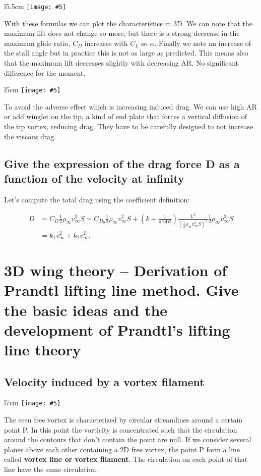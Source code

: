 \documentclass[british,french,11pt, a4paper, openany]{article}
\newcommand{\wrapfig}[6]{%
	\begin{wrapfigure}[#1]{#2}{#3cm}%
		\vspace{-5mm}%
		\texttt{[image: \#5]}%
		\captionof{figure}{}%
		\label{#6}%
	\end{wrapfigure}%
}
\begin{document}
\wrapfig{8}{l}{5.5}{0.08}{ch3/8}{fig:3.8}
With these formulas we can plot the characteristics in 3D. We can note that the maximum lift does not change so more, but there is a strong decrease in the maximum glide ratio, $C_D$ increases with $C_L$ so $\alpha$. Finally we note an increase of the stall angle but in practice this is not as large as predicted. This means also that the maximum lift decreases slightly with decreasing AR. No significant difference for the moment. 

\wrapfig{5}{l}{5}{0.1}{ch3/9}{fig:3.9}
To avoid the adverse effect which is increasing induced drag. We can use high AR or add winglet on the tip, a kind of end plate that forces a vertical diffusion of the tip vortex, reducing drag. They have to be carefully designed to not increase the viscous drag. 

\subsection{Give the expression of the drag force D as a function of the velocity at infinity}

Let's compute the total drag using the coefficient definition:

\begin{equation}
\begin{aligned}
D &= C_D \frac{1}{2} \rho _\infty v_\infty ^2 S = C_{D_0} \frac{1}{2} \rho _\infty v_\infty ^2 S + \left(k +\frac{1}{\pi e AR} \right)\frac{L^2}{( \frac{1}{2} \rho _\infty v_\infty ^2 S)^2} \frac{1}{2} \rho _\infty v_\infty ^2 S \\
&= k_1 v_\infty ^2 + k_2 v_\infty^2.
\end{aligned}
\label{eq:3.7}
\end{equation}



\section{3D wing theory – Derivation of Prandtl lifting line method. Give the basic ideas and the development of Prandtl’s lifting line theory}

\subsection{Velocity induced by a vortex filament}
\wrapfig{6}{l}{7}{0.12}{ch3/11}{fig:3.11}
The seen free vortex is characterized by circular streamlines around a certain point P. In this point the vorticity is concentrated such that the circulation around the contours that don't contain the point are null. If we consider several planes above each other containing a 2D free vortex, the point P form a line called \textbf{vortex line or vortex filament}. The circulation on each point of that line have the same circulation.
\end{document}
